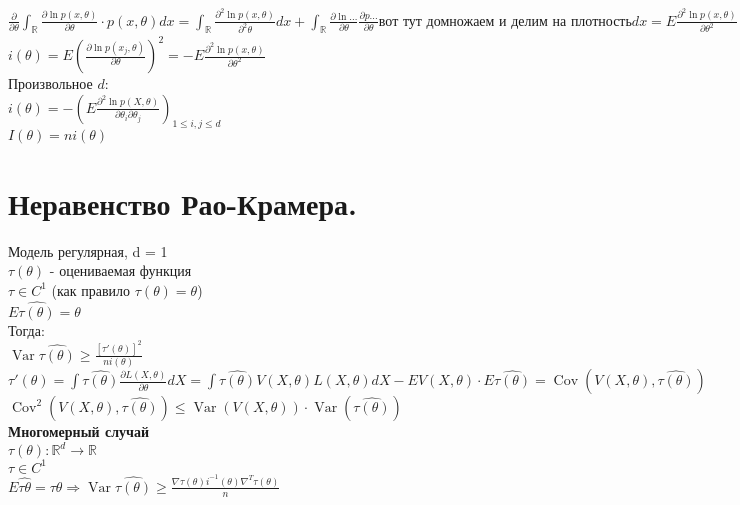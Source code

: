 \documentclass{article}
\newcommand\0{\mathbb{0}}
\DeclareMathOperator{\Var}{Var}
\DeclareMathOperator{\Cov}{Cov}
\newcommand\1{\mathbb{1}}
\newcommand{\pat}{\partial}
\begin{document}
$\frac{\partial}{\partial \theta} \displaystyle\int_\mathbb{R} \frac{\partial \ln{p(x, \theta)}}{\partial \theta} \cdot p(x, \theta) dx = \displaystyle\int_\mathbb{R} \frac{\partial^2 \ln{p(x, \theta)}}{\pat^2\theta} dx + \displaystyle\int_\mathbb{R} \frac{\partial \ln{\dots}}{\partial \theta} \frac{\partial p \dots}{\partial \theta}\text{вот тут домножаем и делим на плотность} dx = E \frac{\partial^2 \ln{p(x, \theta)}}{\partial \theta^2} + E(\frac{\partial \ln{p(x, \theta)}}{\partial \theta})^2 = 0$\\
$i(\theta) = E(\frac{\partial \ln{p(x_j, \theta)}}{\partial \theta})^2 = -E\frac{\partial^2 \ln{p(x, \theta)}}{\partial \theta^2}$\\
Произвольное $d$:\\
$i(\theta) = -(E\frac{\partial^2 \ln{p(X, \theta)}}{\partial \theta_i \partial \theta_j})_{1 \leq i, j \leq d}$\\
$I(\theta) = n i(\theta)$\\
\section{Неравенство Рао-Крамера.}
Модель регулярная, d = 1\\
$\tau(\theta)$ - оцениваемая функция\\
$\tau \in C^1$ (как правило $\tau(\theta) = \theta$)\\
$E\widehat{\tau(\theta)} = \theta$\\
Тогда:\\
$\Var \widehat{\tau(\theta)} \geq \frac{[\tau'(\theta)]^2}{n i(\theta)}$\\
$\tau'(\theta) = \displaystyle\int \widehat{\tau(\theta)} \frac{\partial L(X, \theta)}{\partial \theta} dX = \displaystyle\int \widehat{\tau(\theta)}V(X, \theta)L(X, \theta)dX - EV(X, \theta) \cdot E\widehat{\tau(\theta)} = \Cov(V(X, \theta), \widehat{\tau(\theta)})$\\
$\Cov^2(V(X, \theta), \widehat{\tau(\theta)}) \leq \Var(V(X, \theta)) \cdot \Var(\widehat{\tau(\theta)})$\\
\textbf{Многомерный случай}\\
$\tau(\theta): \mathbb{R}^d \to \mathbb{R}$\\
$\tau \in C^1$\\
$E\widehat{\tau{\theta}} = \tau{\theta} \Rightarrow \Var\widehat{\tau(\theta)} \geq \frac{\nabla \tau(\theta)i^{-1}(\theta)\nabla^T\tau(\theta)}{n}$\\
\end{document}
